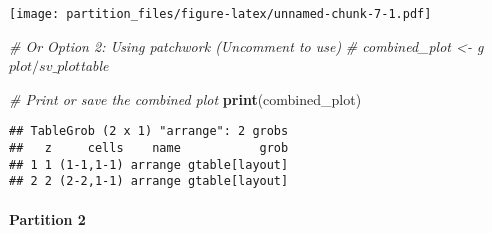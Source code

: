\documentclass[
]{article}
\newenvironment{Shaded}{\begin{snugshade}}{\end{snugshade}}
\newcommand{\AttributeTok}[1]{\textcolor[rgb]{0.13,0.29,0.53}{#1}}
\newcommand{\CommentTok}[1]{\textcolor[rgb]{0.56,0.35,0.01}{\textit{#1}}}
\newcommand{\DecValTok}[1]{\textcolor[rgb]{0.00,0.00,0.81}{#1}}
\newcommand{\FunctionTok}[1]{\textcolor[rgb]{0.13,0.29,0.53}{\textbf{#1}}}
\newcommand{\NormalTok}[1]{#1}
\newcommand{\OtherTok}[1]{\textcolor[rgb]{0.56,0.35,0.01}{#1}}
\newcommand{\SpecialCharTok}[1]{\textcolor[rgb]{0.81,0.36,0.00}{\textbf{#1}}}
\begin{document}
\begin{Shaded}
\end{Shaded}

\texttt{[image: partition\_files/figure-latex/unnamed-chunk-7-1.pdf]}

\begin{Shaded}
\begin{Highlighting}[]
\CommentTok{\# Or Option 2: Using patchwork (Uncomment to use)}
\CommentTok{\# combined\_plot \textless{}{-} g$plot / sv\_plot$table}

\CommentTok{\# Print or save the combined plot}
\FunctionTok{print}\NormalTok{(combined\_plot)}
\end{Highlighting}
\end{Shaded}

\begin{verbatim}
## TableGrob (2 x 1) "arrange": 2 grobs
##   z     cells    name           grob
## 1 1 (1-1,1-1) arrange gtable[layout]
## 2 2 (2-2,1-1) arrange gtable[layout]
\end{verbatim}

\hypertarget{partition-2-1}{%
\paragraph{Partition 2}\label{partition-2-1}}
\end{document}

